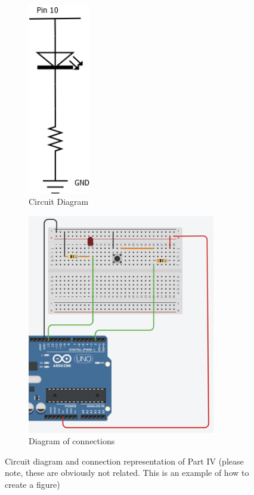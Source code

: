 \documentclass[journal]{IEEEtran}
\begin{document}
\begin{figure}[ht]
    \centering
      \begin{subfigure}[b]{0.2\textwidth}
         \centering
         \includegraphics[width=0.3\textwidth]{images/LED.png} 
         \caption{Circuit Diagram}
         \label{fig:Circuit_diagram}
     \end{subfigure}
     \begin{subfigure}[b]{0.2\textwidth}
         \centering
         \includegraphics[width=0.9\textwidth]{images/lab_report_pic.png} 
         \caption{Diagram of connections}
         \label{fig:connections}
     \end{subfigure}  \hfill
    \caption{Circuit diagram and connection representation of Part IV (please note, these are obviously not related. This is an example of how to create a figure)}
    \label{fig:part1}
\end{figure}
\end{document}
